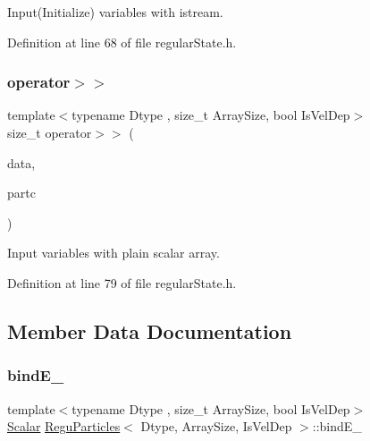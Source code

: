 Input(\+Initialize) variables with istream. 



Definition at line 68 of file regular\+State.\+h.

\mbox{\label{class_regu_particles_a1a83dadd99f0bb6d1403b9f163d275cd}} 
\subsubsection{\texorpdfstring{operator$>$$>$}{operator>>}\hspace{0.1cm}{\footnotesize\ttfamily [2/2]}}
{\footnotesize\ttfamily template$<$typename Dtype , size\+\_\+t Array\+Size, bool Is\+Vel\+Dep$>$ \\
size\+\_\+t operator$>$$>$ (\begin{DoxyParamCaption}\item[{\mbox{\hyperlink{class_vel_indep_particles_a6bba8ac3f941a144214037a27ccaa119}{Dyn\+Scalar\+Array}} \&}]{data,  }\item[{\mbox{\hyperlink{class_regu_particles}{Regu\+Particles}}$<$ Dtype, Array\+Size, Is\+Vel\+Dep $>$ \&}]{partc }\end{DoxyParamCaption})\hspace{0.3cm}{\ttfamily [friend]}}



Input variables with plain scalar array. 



Definition at line 79 of file regular\+State.\+h.



\subsection{Member Data Documentation}
\mbox{\label{class_regu_particles_ac8d1a8a252e1c0ce19bc0b1ca55742bb}} 
\subsubsection{\texorpdfstring{bind\+E\+\_\+}{bindE\_}}
{\footnotesize\ttfamily template$<$typename Dtype , size\+\_\+t Array\+Size, bool Is\+Vel\+Dep$>$ \\
\mbox{\hyperlink{class_vel_indep_particles_a5d275b22f0d759f360ddd80e78f4b466}{Scalar}} \mbox{\hyperlink{class_regu_particles}{Regu\+Particles}}$<$ Dtype, Array\+Size, Is\+Vel\+Dep $>$\+::bind\+E\+\_\+\hspace{0.3cm}{\ttfamily [protected]}}



